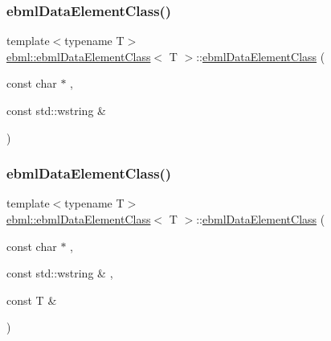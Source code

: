 \subsubsection{\texorpdfstring{ebml\+Data\+Element\+Class()}{ebmlDataElementClass()}\hspace{0.1cm}{\footnotesize\ttfamily [1/6]}}
{\footnotesize\ttfamily template$<$typename T$>$ \\
\mbox{\hyperlink{classebml_1_1ebmlDataElementClass}{ebml\+::ebml\+Data\+Element\+Class}}$<$ T $>$\+::\mbox{\hyperlink{classebml_1_1ebmlDataElementClass}{ebml\+Data\+Element\+Class}} (\begin{DoxyParamCaption}\item[{const char $\ast$}]{,  }\item[{const std\+::wstring \&}]{ }\end{DoxyParamCaption})}

\mbox{\label{classebml_1_1ebmlDataElementClass_a9041c4768574aa8a05008622c59d1505}} 
\subsubsection{\texorpdfstring{ebml\+Data\+Element\+Class()}{ebmlDataElementClass()}\hspace{0.1cm}{\footnotesize\ttfamily [2/6]}}
{\footnotesize\ttfamily template$<$typename T$>$ \\
\mbox{\hyperlink{classebml_1_1ebmlDataElementClass}{ebml\+::ebml\+Data\+Element\+Class}}$<$ T $>$\+::\mbox{\hyperlink{classebml_1_1ebmlDataElementClass}{ebml\+Data\+Element\+Class}} (\begin{DoxyParamCaption}\item[{const char $\ast$}]{,  }\item[{const std\+::wstring \&}]{,  }\item[{const T \&}]{ }\end{DoxyParamCaption})}

\mbox{\label{classebml_1_1ebmlDataElementClass_a563cc43ab0bffe8be47cd3c675ce675e}} 
